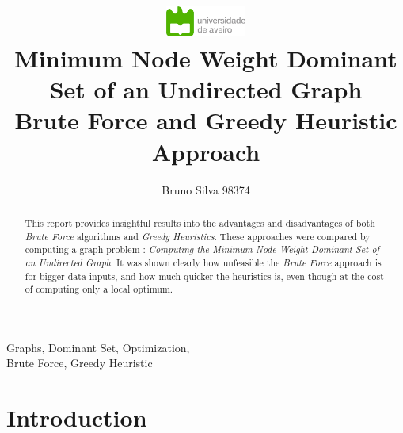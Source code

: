 \documentclass[mirror,times]{revdetua}
\begin{document}


\title{
  \includegraphics[width=0.2\textwidth]{resources/ua_logo.png}\\
  \LARGE{Minimum Node Weight Dominant Set of an Undirected Graph}\\ 
Brute Force and Greedy Heuristic Approach\\
}

\author{Bruno Silva 98374} %
\maketitle

\begin{abstract}%
  This report provides insightful results into the advantages and disadvantages
  of both \textit{Brute Force} algorithms and \textit{Greedy Heuristics}. These
  approaches were compared by computing a graph problem : \textit{Computing the
  Minimum Node Weight Dominant Set of an Undirected Graph}. It was shown clearly how
  unfeasible the \textit{Brute Force} approach is for bigger data inputs, and
  how much quicker the heuristics is, even though at the cost of computing only
  a local optimum.
\end{abstract}

\begin{keywords}%
  Graphs, Dominant Set, Optimization,\\ Brute Force, Greedy Heuristic
\end{keywords}

\section{Introduction}
\end{document}

